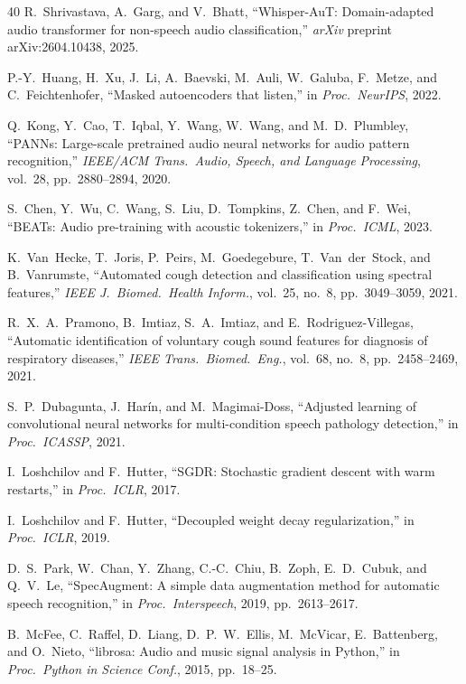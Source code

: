 \documentclass[10pt,journal,compsoc]{IEEEtran}
\begin{document}
\begin{thebibliography}{40}
R.~Shrivastava, A.~Garg, and V.~Bhatt,
``Whisper-AuT: Domain-adapted audio transformer for non-speech audio
classification,'' \textit{arXiv} preprint arXiv:2604.10438, 2025.

P.-Y.~Huang, H.~Xu, J.~Li, A.~Baevski, M.~Auli, W.~Galuba,
F.~Metze, and C.~Feichtenhofer,
``Masked autoencoders that listen,''
in \textit{Proc.\ NeurIPS}, 2022.

Q.~Kong, Y.~Cao, T.~Iqbal, Y.~Wang, W.~Wang, and M.~D.~Plumbley,
``PANNs: Large-scale pretrained audio neural networks for audio pattern
recognition,'' \textit{IEEE/ACM Trans.\ Audio, Speech, and Language
Processing}, vol.\ 28, pp.\ 2880--2894, 2020.

S.~Chen, Y.~Wu, C.~Wang, S.~Liu, D.~Tompkins, Z.~Chen, and F.~Wei,
``BEATs: Audio pre-training with acoustic tokenizers,''
in \textit{Proc.\ ICML}, 2023.

K.~Van~Hecke, T.~Joris, P.~Peirs, M.~Goedegebure, T.~Van~der~Stock,
and B.~Vanrumste,
``Automated cough detection and classification using spectral features,''
\textit{IEEE J.\ Biomed.\ Health Inform.}, vol.\ 25, no.\ 8,
pp.\ 3049--3059, 2021.

R.~X.~A.~Pramono, B.~Imtiaz, S.~A.~Imtiaz, and E.~Rodriguez-Villegas,
``Automatic identification of voluntary cough sound features for
diagnosis of respiratory diseases,'' \textit{IEEE Trans.\ Biomed.\
Eng.}, vol.\ 68, no.\ 8, pp.\ 2458--2469, 2021.

S.~P.~Dubagunta, J.~Har\'{i}n, and M.~Magimai-Doss,
``Adjusted learning of convolutional neural networks for multi-condition
speech pathology detection,'' in \textit{Proc.\ ICASSP}, 2021.

I.~Loshchilov and F.~Hutter,
``SGDR: Stochastic gradient descent with warm restarts,''
in \textit{Proc.\ ICLR}, 2017.

I.~Loshchilov and F.~Hutter,
``Decoupled weight decay regularization,''
in \textit{Proc.\ ICLR}, 2019.

D.~S.~Park, W.~Chan, Y.~Zhang, C.-C.~Chiu, B.~Zoph, E.~D.~Cubuk,
and Q.~V.~Le,
``SpecAugment: A simple data augmentation method for automatic speech
recognition,'' in \textit{Proc.\ Interspeech}, 2019, pp.\ 2613--2617.

B.~McFee, C.~Raffel, D.~Liang, D.~P.~W.~Ellis, M.~McVicar, E.~Battenberg,
and O.~Nieto,
``librosa: Audio and music signal analysis in Python,''
in \textit{Proc.\ Python in Science Conf.}, 2015, pp.\ 18--25.

\end{thebibliography}
\end{document}

